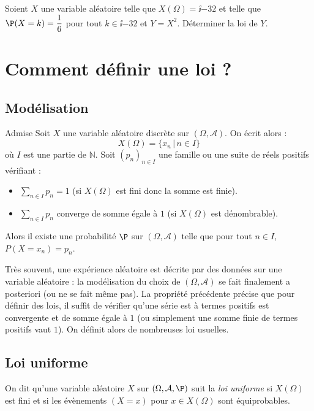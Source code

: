 \documentclass[french,11pt,twoside]{VcCours}
\begin{document}
\begin{ApplicationDirecte}{} Soient $X$ une variable aléatoire telle que $X(\Omega) = \ii {-3}2$ et telle que $\P(X=k) = \dfrac 16$ pour tout $k \in \ii {-3}2$ et $Y = X^2$. Déterminer la loi de $Y$.
 \end{ApplicationDirecte}

\section{Comment définir une loi ?}
\subsection{Modélisation}
\begin{Proposition}{Admise}
Soit $X$ une variable aléatoire discrète sur $(\Omega, \mathcal{A})$. On écrit alors :
$$ X(\Omega)= \lbrace x_n \, \vert \, n \in I \rbrace$$
où $I$ est une partie de $\mathbb{N}$. Soit $(p_n)_{n \in I}$ une famille ou une suite de réels positifs vérifiant :
\begin{itemize}
\item $\sum_{n \in I} p_n = 1$ (si $X(\Omega)$ est fini donc la somme est finie).
\item $\sum_{n \in I} p_n$ converge de somme égale à $1$ (si $X(\Omega)$ est dénombrable).
\end{itemize}
Alors il existe une probabilité $\P$ sur $(\Omega, \mathcal{A})$ telle que pour tout $n \in I$, $P(X=x_n)=p_n$.
\end{Proposition}

Très souvent, une expérience aléatoire est décrite par des données sur une variable aléatoire : la modélisation du choix de $(\Omega, \mathcal{A})$ se fait finalement a posteriori (ou ne se fait même pas).  La propriété précédente précise que pour définir des lois, il suffit de vérifier qu'une série est à termes positifs est convergente et de somme égale à $1$ (ou simplement une somme finie de termes positifs vaut $1$). On définit alors de nombreuses loi usuelles.

\subsection{Loi uniforme}

\begin{Definition}{} On dit qu'une variable aléatoire $X$ sur $(\Omega, \mathcal{A}, \P)$ suit la \emph{loi uniforme} si $X(\Omega)$ est fini et si les évènements $(X=x)$ pour $x \in X(\Omega)$ sont équiprobables.
\end{Definition}
\end{document}
